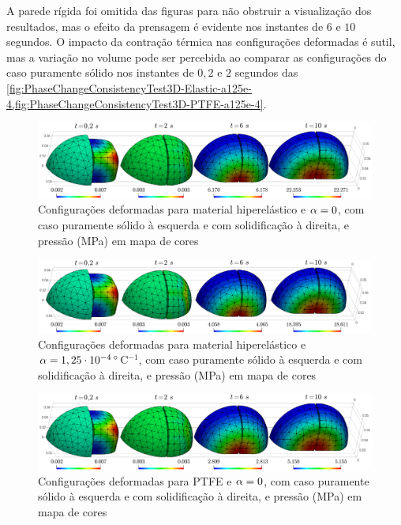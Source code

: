 \documentclass[Tese.tex]{subfiles}
\begin{document}
A parede rígida foi omitida das figuras para não obstruir a visualização dos resultados, mas o efeito da prensagem é evidente nos instantes de $6$ e $10$ segundos. O impacto da contração térmica nas configurações deformadas é sutil, mas a variação no volume pode ser percebida ao comparar as configurações do caso puramente sólido nos instantes de $0,2$ e $2$ segundos das \cref{fig:PhaseChangeConsistencyTest3D-Elastic-a125e-4,fig:PhaseChangeConsistencyTest3D-PTFE-a125e-4}.

\begin{figure}[!htb]
	\centering
	\caption{Configurações deformadas para material hiperelástico e $\alpha = 0$, com caso puramente sólido à esquerda e com solidificação à direita, e pressão (MPa) em mapa de cores}
	\label{fig:PhaseChangeConsistencyTest3D-Elastic}
	\includegraphics[width=\textwidth]{Figuras/PhaseChangeConsistencyTest3D/Elastic-a0.png}
\end{figure}

\begin{figure}[!htb]
	\centering
	\caption{Configurações deformadas para material hiperelástico e $\alpha = 1,25\cdot 10^{-4}\,^{\circ}$C$^{-1}$, com caso puramente sólido à esquerda e com solidificação à direita, e pressão (MPa) em mapa de cores}
	\label{fig:PhaseChangeConsistencyTest3D-Elastic-a125e-4}
	\includegraphics[width=\textwidth]{Figuras/PhaseChangeConsistencyTest3D/Elastic-a125e-4.png}
\end{figure}

\begin{figure}[!htb]
	\centering
	\caption{Configurações deformadas para PTFE e $\alpha = 0$, com caso puramente sólido à esquerda e com solidificação à direita, e pressão (MPa) em mapa de cores}
	\label{fig:PhaseChangeConsistencyTest3D-PTFE}
	\includegraphics[width=\textwidth]{Figuras/PhaseChangeConsistencyTest3D/PTFE-a0.png}
\end{figure}
\end{document}
